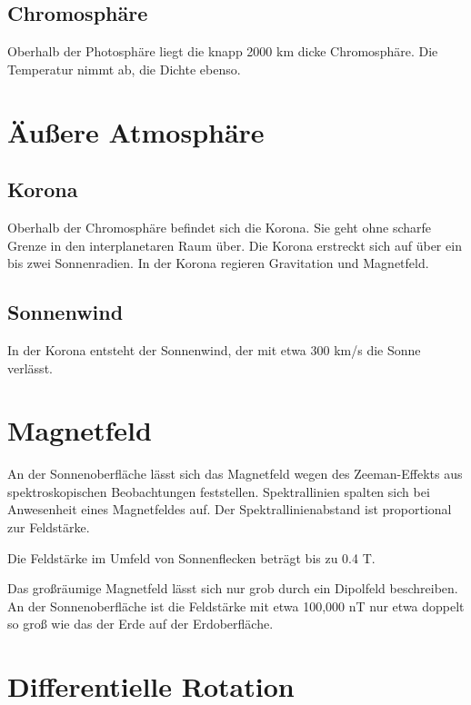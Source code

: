 \documentclass[
  a4paper,
  DIV=11]{scrreprt}
\begin{document}
\hypertarget{chromosphuxe4re}{%
\subsection{Chromosphäre}\label{chromosphuxe4re}}

Oberhalb der Photosphäre liegt die knapp 2000 km dicke Chromosphäre. Die
Temperatur nimmt ab, die Dichte ebenso.

\hypertarget{uxe4uuxdfere-atmosphuxe4re}{%
\section{Äußere Atmosphäre}\label{uxe4uuxdfere-atmosphuxe4re}}

\hypertarget{korona}{%
\subsection{Korona}\label{korona}}

Oberhalb der Chromosphäre befindet sich die Korona. Sie geht ohne
scharfe Grenze in den interplanetaren Raum über. Die Korona erstreckt
sich auf über ein bis zwei Sonnenradien. In der Korona regieren
Gravitation und Magnetfeld.

\hypertarget{sonnenwind}{%
\subsection{Sonnenwind}\label{sonnenwind}}

In der Korona entsteht der Sonnenwind, der mit etwa 300 km/s die Sonne
verlässt.

\hypertarget{magnetfeld}{%
\section{Magnetfeld}\label{magnetfeld}}

An der Sonnenoberfläche lässt sich das Magnetfeld wegen des
Zeeman-Effekts aus spektroskopischen Beobachtungen feststellen.
Spektrallinien spalten sich bei Anwesenheit eines Magnetfeldes auf. Der
Spektrallinienabstand ist proportional zur Feldstärke.

Die Feldstärke im Umfeld von Sonnenflecken beträgt bis zu 0.4 T.

Das großräumige Magnetfeld lässt sich nur grob durch ein Dipolfeld
beschreiben. An der Sonnenoberfläche ist die Feldstärke mit etwa 100,000
nT nur etwa doppelt so groß wie das der Erde auf der Erdoberfläche.

\hypertarget{differentielle-rotation}{%
\section{Differentielle Rotation}\label{differentielle-rotation}}
\end{document}
